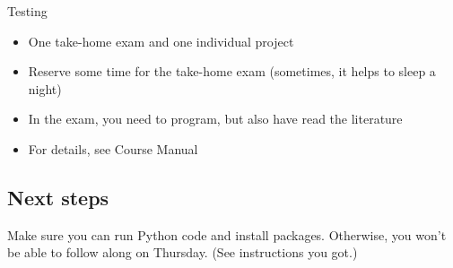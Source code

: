 \begin{frame}{Testing}
\begin{itemize}
	\item One take-home exam and one individual project
	\item Reserve some time for the take-home exam (sometimes, it helps to sleep a night)
	\item In the exam, you need to program, but also have read the literature
	\item For details, see Course Manual
\end{itemize}
\end{frame}


\subsection{Next steps}


\begin{frame}[standout]
	Make sure you can run Python code and install packages. Otherwise, you won't be able to follow along on Thursday. (See instructions you got.)
\end{frame}


\begin{frame}
	\printbibliography
\end{frame}



